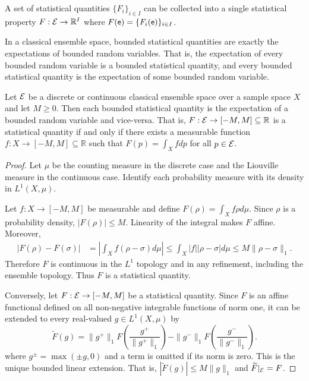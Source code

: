\begin{mathSection}
\begin{coro}
	A set of statistical quantities $\{F_i\}_{i \in I}$ can be collected into a single statistical property $F : \mathcal{E} \to \mathbb{R}^I$ where $F(\mathsf{e}) = \{F_i(\mathsf{e})\}_{i \in I}$.
\end{coro}
\end{mathSection}

In a classical ensemble space, bounded statistical quantities are exactly the expectations of bounded random variables. That is, the expectation of every bounded random variable is a bounded statistical quantity, and every bounded statistical quantity is the expectation of some bounded random variable.

\begin{mathSection}
\begin{prop}
	Let $\mathcal{E}$ be a discrete or continuous classical ensemble space over a sample space $X$ and let $M \geq 0$. Then each bounded statistical quantity is the expectation of a bounded random variable and vice-versa. That is, $F : \mathcal{E} \to [-M,M] \subseteq \mathbb{R}$ is a statistical quantity if and only if there exists a measurable function $f : X \to [-M,M] \subseteq \mathbb{R}$ such that $F(p) = \int_X f dp$ for all $p \in \mathcal{E}$. 
\end{prop}

\begin{proof}
	Let $\mu$ be the counting measure in the discrete case and the Liouville measure in the continuous case. Identify each probability measure with its density in $L^1(X,\mu)$.
	
	Let $f : X \to [-M,M]$ be measurable and define $F(\rho) = \int_X f \rho d\mu$. Since $\rho$ is a probability density, $|F(\rho)| \leq M$. Linearity of the integral makes $F$ affine. Moreover,
	\begin{equation}
		\begin{aligned}
			|F(\rho)-F(\sigma)| &= \left|\int_X f(\rho-\sigma)d\mu\right| \leq \int_X |f| |\rho-\sigma|d\mu \leq M \|\rho-\sigma\|_1.
		\end{aligned}
	\end{equation}
	Therefore $F$ is continuous in the $L^1$ topology and in any refinement, including the ensemble topology. Thus $F$ is a statistical quantity.

	Conversely, let $F : \mathcal{E} \to [-M,M]$ be a statistical quantity. Since $F$ is an affine functional defined on all non-negative integrable functions of norm one, it can be extended to every real-valued $g \in L^1(X,\mu)$ by
	\begin{equation}
		\widetilde{F}(g) = \|g^+\|_1 F\left(\frac{g^+}{\|g^+\|_1}\right)-\|g^-\|_1 F\left(\frac{g^-}{\|g^-\|_1}\right).
	\end{equation}
	where $g^\pm=\max(\pm g,0)$ and a term is omitted if its norm is zero. This is the unique bounded linear extension. That is, $|\widetilde F(g)|\le M\|g\|_1$ and $\widetilde{F}|_{\mathcal{E}} = F$.


\end{proof}
\end{mathSection}

